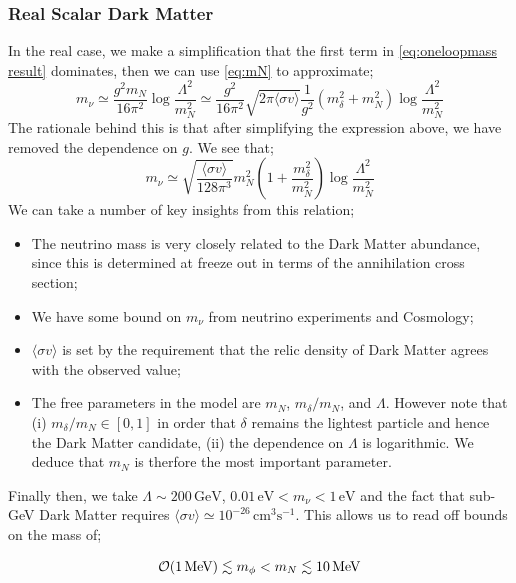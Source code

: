 \documentclass[10pt]{article}
\begin{document}
\subsubsection*{Real Scalar Dark Matter}
In the real case, we make a simplification that the first term in \eqref{eq:oneloopmass result} dominates, then we can use \eqref{eq:mN} to approximate;
\begin{equation}
  m_{\nu} \simeq \frac{g^2 m_N}{16\pi^2}\log \frac{\Lambda^2}{m_N^2} \simeq \frac{g^2}{16\pi^2}\sqrt{2\pi\langle\sigma v\rangle}\frac{1}{g^2}(m_\delta^2 + m_N^2)\log\frac{\Lambda^2}{m_N^2}
\end{equation}
The rationale behind this is that after simplifying the expression above, we have removed the dependence on $g$. We see that;
\begin{equation}
  m_\nu \simeq \sqrt{\frac{\langle\sigma v\rangle}{128\pi^3}}m_N^2 \left(1 + \frac{m_\delta^2}{m_N^2}\right)\log\frac{\Lambda^2}{m_N^2}
\end{equation}
We can take a number of key insights from this relation;
\begin{itemize}
  \item The neutrino mass is very closely related to the Dark Matter abundance, since this is determined at freeze out in terms of the annihilation cross section;
  \item We have some bound on $m_\nu$ from neutrino experiments and Cosmology;
  \item $\langle\sigma v \rangle$ is set by the requirement that the relic density of Dark Matter agrees with the observed value;
  \item The free parameters in the model are $m_N$, $m_\delta/m_N$, and $\Lambda$. However note that (i) $m_\delta/m_N \in [0, 1]$ in order that $\delta$ remains the lightest particle and hence the Dark Matter candidate, (ii) the dependence on $\Lambda$ is logarithmic. We deduce that $m_N$ is therfore the most important parameter.
\end{itemize}
Finally then, we take \cite{Boehm2006} $\Lambda \sim 200 \, \text{GeV}$, $0.01 \, \text{eV} < m_\nu < 1\, \text{eV}$ and the fact that sub-GeV Dark Matter requires $\langle \sigma v \rangle \simeq 10^{-26}\, \text{cm}^3\text{s}^{-1}$. This allows us to read off bounds on the mass of;
\begin{framed}
\begin{equation}
  \mathcal{O}(1 \, \text{MeV}) \lesssim m_\phi < m_N \lesssim 10 \, \text{MeV}
\end{equation}
\end{framed}
\end{document}
